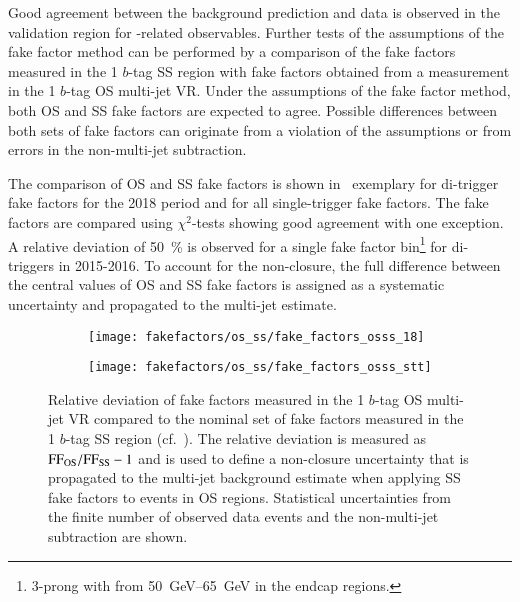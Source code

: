 Good agreement between the background prediction and data is observed
in the validation region for \tauhadvis-related observables. Further
tests of the assumptions of the fake factor method can be performed by
a comparison of the fake factors measured in the 1 $b$-tag SS region
with fake factors obtained from a measurement in the 1 $b$-tag OS
multi-jet VR. Under the assumptions of the fake factor method, both OS
and SS fake factors are expected to agree. Possible differences
between both sets of fake factors can originate from a violation of
the assumptions or from errors in the non-multi-jet subtraction.

The comparison of OS and SS fake factors is shown
in~ exemplary for di-\tauhadvis trigger
fake factors for the 2018 period and for all single-\tauhadvis trigger
fake factors. The fake factors are compared using $\chi^2$-tests
showing good agreement with one exception. A relative deviation of
\SI{50}{\percent} is observed for a single fake factor
bin\footnote{3-prong \tauhadvis with \pT from \SIrange{50}{65}{\GeV}
  in the endcap regions.} for di-\tauhadvis triggers in 2015-2016. To
account for the non-closure, the full difference between the central
values of OS and SS fake factors is assigned as a systematic
uncertainty and propagated to the multi-jet estimate.

\begin{figure}[htbp]
  \centering

  \begin{subfigure}[t]{0.48\textwidth}
    \texttt{[image: fakefactors/os\_ss/fake\_factors\_osss\_18]}
    \label{fig:fake_factor_OSSS_dtt}
  \end{subfigure}\hfill%
  \begin{subfigure}[t]{0.48\textwidth}
    \texttt{[image: fakefactors/os\_ss/fake\_factors\_osss\_stt]}
    \label{fig:fake_factor_OSSS_stt}
  \end{subfigure}

  \caption{Relative deviation of fake factors measured in the 1
    $b$-tag OS multi-jet VR compared to the nominal set of fake
    factors measured in the 1 $b$-tag SS region (cf.\
    ). The relative
    deviation is measured as $\text{FF}_\text{OS} / \text{FF}_\text{SS} - 1$ and
    is used to define a non-closure uncertainty that is propagated to
    the multi-jet background estimate when applying SS fake factors to
    events in OS regions. Statistical uncertainties from the finite
    number of observed data events and the non-multi-jet subtraction
    are shown.}
  \label{fig:fake_factor_OSSS}
\end{figure}


